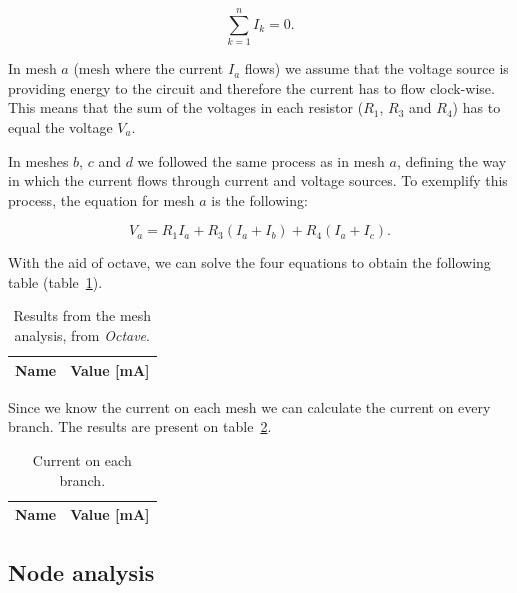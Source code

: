\begin{equation}
    \sum_{k=1}^{n} I_k = 0.
    \label{eq:KCL}
\end{equation}

In mesh $a$ (mesh where the current $I_a$ flows) we assume that the voltage source is providing energy to the circuit and therefore the current has to flow clock-wise. This means that the sum of the voltages in each resistor ($R_1$, $R_3$ and $R_4$) has to equal the voltage $V_a$.

In meshes $b$, $c$ and $d$ we followed the same process as in mesh $a$, defining the way in which the current flows through current and voltage sources.
To exemplify this process, the equation for mesh $a$ is the following:

\begin{equation}
    V_a=R_1I_a+R_3(I_a+I_b)+R_4(I_a+I_c).
\end{equation}

With the aid of octave, we can solve the four equations to obtain the following table (table~\ref{tab:Imesh}).

\begin{table}[h]
  \centering
  \begin{tabular}{|l|r|}
    \hline    
    {\bf Name} & {\bf Value [mA]} \\ \hline
    
  \end{tabular}
  \caption{Results from the mesh analysis, from \textit{Octave}.}
  \label{tab:Imesh}
\end{table}

Since we know the current on each mesh we can calculate the current on every branch. The results are present on table~\ref{tab:Ibranch}.

\begin{table}[h]
  \centering
  \begin{tabular}{|l|r|}
    \hline    
    {\bf Name} & {\bf Value [mA]} \\ \hline
    
  \end{tabular}
  \caption{Current on each branch.}
  \label{tab:Ibranch}
\end{table}


\subsection{Node analysis}

